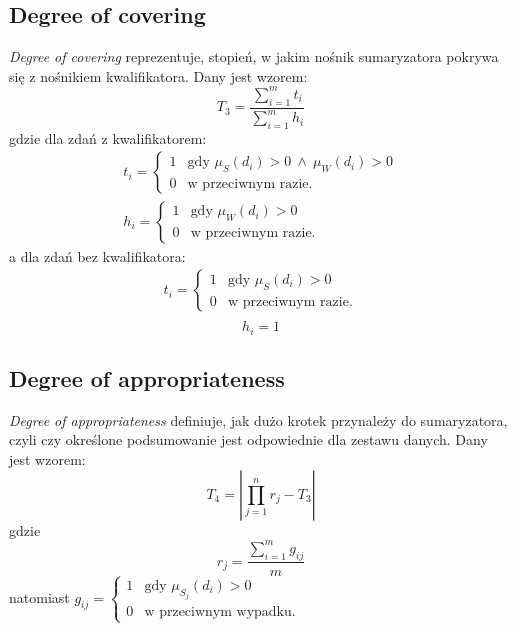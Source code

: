 \documentclass{classrep}
\begin{document}
	\subsection{Degree of covering}
\textsl{Degree of covering} reprezentuje, stopień, w jakim nośnik sumaryzatora pokrywa się z nośnikiem kwalifikatora. Dany jest wzorem:
	\begin{equation}
T_3 = \frac{\sum_{i=1}^{m}t_i}{\sum_{i=1}^{m}h_i}
	\end{equation}
gdzie dla zdań z kwalifikatorem:
\[
\begin{array}{l}
t_i = \begin{cases}
1 & \mbox{gdy } \mu_{S}(d_i) > 0 ~ \wedge ~ \mu_{W}(d_i) > 0 \\
0 & \mbox{w przeciwnym razie.}
\end{cases} \\
h_i = \begin{cases}
1 & \mbox{gdy } \mu_{W}(d_i) > 0 \\
0 & \mbox{w przeciwnym razie.}
\end{cases}
\end{array}\]
a dla zdań bez kwalifikatora:
\[
\begin{array}{l}
t_i = \begin{cases}
1 & \mbox{gdy } \mu_{S}(d_i) > 0  \\
0 & \mbox{w przeciwnym razie.}
\end{cases} \\
\end{array}\]
\[h_i = 1\]



	\subsection{Degree of appropriateness}
\textsl{Degree of appropriateness} definiuje, jak dużo krotek przynależy do sumaryzatora, czyli czy określone podsumowanie jest odpowiednie dla zestawu danych. Dany jest wzorem:
\begin{equation}
T_4 = \left| \prod_{j=1}^{n} r_j - T_3\right|
\end{equation}
gdzie
\begin{equation}
r_j = \frac{\sum_{i=1}^{m} g_{ij}}{m}
\end{equation}
natomiast
$
g_{ij} = \begin{cases}
1 & \mbox{gdy } \mu_{S_j}(d_i) > 0 \\
0 & \mbox{w przeciwnym wypadku.}
\end{cases}
$
\end{document}
